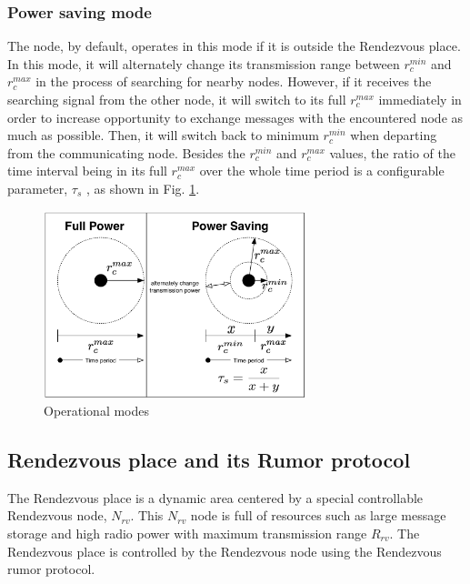 \documentclass[conference]{IEEEtran}
\begin{document}
\subsubsection{Power saving mode}
The node, by default, operates in this mode if it is outside the Rendezvous place.
%
In this mode, it will alternately change its transmission range between ${ r }_{ c }^{ min }$ and ${ r }_{ c }^{ max }$ in the process of searching for nearby nodes.
%
However, if it receives the searching signal from the other node, it will switch to its full ${ r }_{ c }^{ max }$ immediately in order to increase opportunity to exchange messages with the encountered node as much as possible.
%
Then, it will switch back to minimum ${ r }_{ c }^{ min }$ when departing from the communicating node.
%
Besides the ${ r }_{ c }^{ min }$ and ${ r }_{ c }^{ max }$ values, the ratio of the time interval being in its full ${ r }_{ c }^{ max }$ over the whole time period is a configurable parameter, $\tau_{s}$ , as shown in Fig. \ref{Operational modes}.

\begin{figure}[!t]
	\centering
	\includegraphics[width=3in]{Figures/OperationalMode.pdf}
	\caption{Operational modes}
	\label{Operational modes}
\end{figure}


\subsection{Rendezvous place and its Rumor protocol}

The Rendezvous place is a dynamic area centered by a special controllable Rendezvous node, $N_{rv}$.
%
This $N_{rv}$ node is full of resources such as large message storage and high radio power with maximum transmission range $R_{rv}$.
%
The Rendezvous place is controlled by the Rendezvous node using the Rendezvous rumor protocol.
\end{document}
